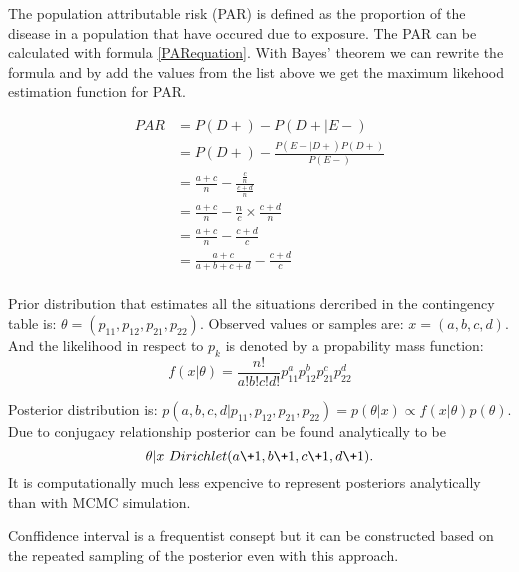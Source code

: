 The population attributable risk (PAR) is defined as the proportion of the disease in a population that have occured due to exposure. The PAR can be calculated with formula \ref{PARequation}. With Bayes' theorem we can rewrite the formula and by add the values from the list above we get the maximum likehood estimation function for PAR.

\begin{equation}
\begin{split}
PAR &= P(D+) - P(D+| E-) \\
    &= P(D+) - \frac{P(E-|D+)P(D+)}{P(E-)} \\
    &= \frac{a + c}{n} - \frac{\frac{c}{n}}{\frac{c + d}{n}} \\
    &= \frac{a + c}{n} - \frac{n}{c} \times  \frac{c + d}{n} \\
    &= \frac{a + c}{n} - \frac{c + d}{c} \\
    &= \frac{a + c}{a + b + c + d} - \frac{c + d}{c} \\
\end{split}
\end{equation}

Prior distribution that estimates all the situations dercribed in the contingency table is: 
$\theta = (p_{11}, p_{12}, p_{21}, p_{22})$. Observed values or samples are: $x = (a, b, c, d)$. And the likelihood in respect to $p_k$ is denoted by a propability mass function: 
\begin{equation}
    f(x|\theta) = \frac{n!}{a!b!c!d!}p_{11}^ap_{12}^bp_{21}^cp_{22}^d
\end{equation}

Posterior distribution is: $p(a,b,c,d|p_{11}, p_{12},p_{21},p_{22}) = p(\theta|x) \varpropto  f (x|\theta)p(\theta)$. Due to conjugacy relationship posterior can be found analytically to be
\begin{equation}
    \theta|x ~ Dirichlet(a \+ 1, b \+ 1, c \+ 1, d \+ 1).
\end{equation}
It is computationally much less expencive to represent posteriors analytically than with MCMC simulation. 

Conffidence interval is a frequentist consept but it can be constructed based on the repeated sampling of the posterior even with this approach. 


